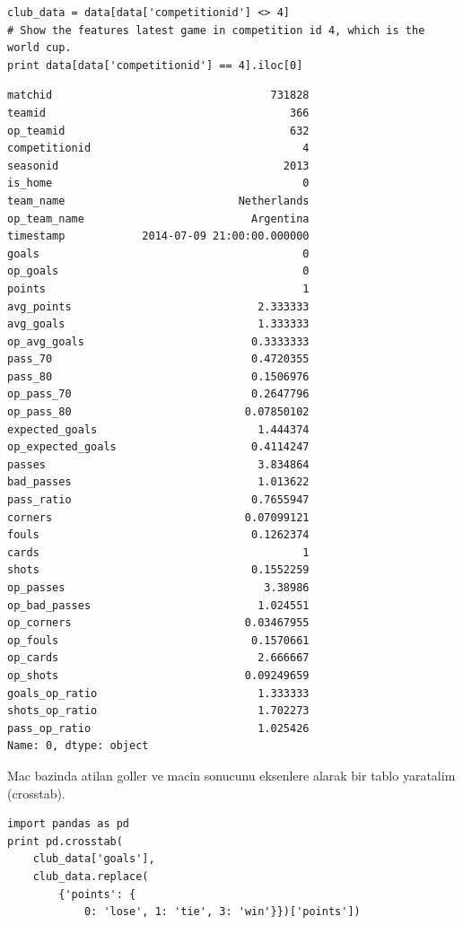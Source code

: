 \documentclass[12pt,fleqn]{article}\usepackage{../common}
\begin{document}
\begin{verbatim}
club_data = data[data['competitionid'] <> 4]
# Show the features latest game in competition id 4, which is the world cup.
print data[data['competitionid'] == 4].iloc[0]
\end{verbatim}

\begin{verbatim}
matchid                                  731828
teamid                                      366
op_teamid                                   632
competitionid                                 4
seasonid                                   2013
is_home                                       0
team_name                           Netherlands
op_team_name                          Argentina
timestamp            2014-07-09 21:00:00.000000
goals                                         0
op_goals                                      0
points                                        1
avg_points                             2.333333
avg_goals                              1.333333
op_avg_goals                          0.3333333
pass_70                               0.4720355
pass_80                               0.1506976
op_pass_70                            0.2647796
op_pass_80                           0.07850102
expected_goals                         1.444374
op_expected_goals                     0.4114247
passes                                 3.834864
bad_passes                             1.013622
pass_ratio                            0.7655947
corners                              0.07099121
fouls                                 0.1262374
cards                                         1
shots                                 0.1552259
op_passes                               3.38986
op_bad_passes                          1.024551
op_corners                           0.03467955
op_fouls                              0.1570661
op_cards                               2.666667
op_shots                             0.09249659
goals_op_ratio                         1.333333
shots_op_ratio                         1.702273
pass_op_ratio                          1.025426
Name: 0, dtype: object
\end{verbatim}

Mac bazinda atilan goller ve macin sonucunu eksenlere alarak bir tablo
yaratalim (crosstab).

\begin{verbatim}
import pandas as pd
print pd.crosstab(
    club_data['goals'], 
    club_data.replace(
        {'points': {
            0: 'lose', 1: 'tie', 3: 'win'}})['points'])
\end{verbatim}
\end{document}
